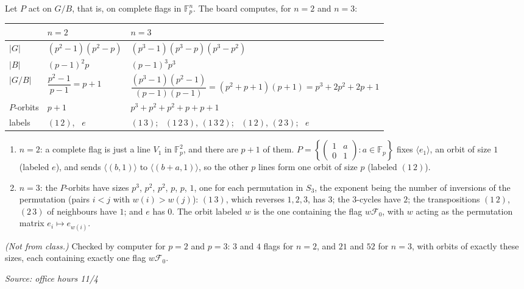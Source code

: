 \documentclass[11pt]{report}
\newcommand{\srcline}[1]{\par\hfill{\footnotesize\textit{Source: #1}}}
\begin{document}
\begin{exbox}\label{ex:unitriangular-orbits-flags}
Let $P$ act on $G/B$, that is, on complete flags in $\mathbb{F}_p^n$. The board computes, for $n = 2$ and $n = 3$:
\begin{center}
\renewcommand{\arraystretch}{1.35}
\begin{tabular}{l|l|l}
 & $n = 2$ & $n = 3$ \\ \hline
$|G|$ & $(p^2-1)(p^2-p)$ & $(p^3-1)(p^3-p)(p^3-p^2)$ \\
$|B|$ & $(p-1)^2p$ & $(p-1)^3p^3$ \\
$|G/B|$ & $\dfrac{p^2-1}{p-1} = p + 1$ & $\dfrac{(p^3-1)(p^2-1)}{(p-1)(p-1)} = (p^2+p+1)(p+1) = p^3 + 2p^2 + 2p + 1$ \\
$P$-orbits & $p + 1$ & $p^3 + p^2 + p^2 + p + p + 1$ \\
labels & $(1\,2)$, \ $e$ & $(1\,3)$; \ $(1\,2\,3)$, $(1\,3\,2)$; \ $(1\,2)$, $(2\,3)$; \ $e$
\end{tabular}
\end{center}
\begin{enumerate}
    \item $n = 2$: a complete flag is just a line $V_1$ in $\mathbb{F}_p^2$, and there are $p + 1$ of them. $P = \left\{\left(\begin{smallmatrix} 1 & a \\ 0 & 1 \end{smallmatrix}\right) : a \in \mathbb{F}_p\right\}$ fixes $\langle e_1 \rangle$, an orbit of size $1$ (labeled $e$), and sends $\langle (b, 1) \rangle$ to $\langle (b + a, 1) \rangle$, so the other $p$ lines form one orbit of size $p$ (labeled $(1\,2)$).
    \item $n = 3$: the $P$-orbits have sizes $p^3$, $p^2$, $p^2$, $p$, $p$, $1$, one for each permutation in $S_3$, the exponent being the number of inversions of the permutation (pairs $i < j$ with $w(i) > w(j)$): $(1\,3)$, which reverses $1, 2, 3$, has $3$; the $3$-cycles have $2$; the transpositions $(1\,2)$, $(2\,3)$ of neighbours have $1$; and $e$ has $0$. The orbit labeled $w$ is the one containing the flag $w\mathcal{F}_0$, with $w$ acting as the permutation matrix $e_i \mapsto e_{w(i)}$.
\end{enumerate}
\textit{(Not from class.)} Checked by computer for $p = 2$ and $p = 3$: $3$ and $4$ flags for $n = 2$, and $21$ and $52$ for $n = 3$, with orbits of exactly these sizes, each containing exactly one flag $w\mathcal{F}_0$.
\srcline{office hours 11/4}
\end{exbox}
\end{document}

